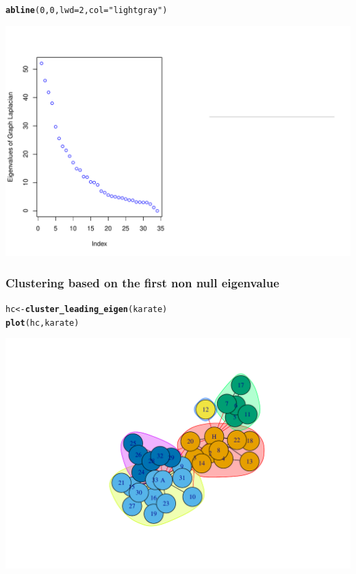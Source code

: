 \documentclass{beamer}\usepackage[]{graphicx}\usepackage[]{color}
\makeatletter
\newcommand{\hlnum}[1]{\textcolor[rgb]{0.686,0.059,0.569}{#1}}%
\newcommand{\hlstr}[1]{\textcolor[rgb]{0.192,0.494,0.8}{#1}}%
\newcommand{\hlstd}[1]{\textcolor[rgb]{0.345,0.345,0.345}{#1}}%
\newcommand{\hlkwb}[1]{\textcolor[rgb]{0.69,0.353,0.396}{#1}}%
\newcommand{\hlkwc}[1]{\textcolor[rgb]{0.333,0.667,0.333}{#1}}%
\newcommand{\hlkwd}[1]{\textcolor[rgb]{0.737,0.353,0.396}{\textbf{#1}}}%
\newenvironment{kframe}{%
 \def\at@end@of@kframe{}%
 \ifinner\ifhmode%
  \def\at@end@of@kframe{\end{minipage}}%
  \begin{minipage}{\columnwidth}%
 \fi\fi%
 \def\FrameCommand##1{\hskip\@totalleftmargin \hskip-\fboxsep
 \colorbox{shadecolor}{##1}\hskip-\fboxsep
     \hskip-\linewidth \hskip-\@totalleftmargin \hskip\columnwidth}%
 \MakeFramed {\advance\hsize-\width
   \@totalleftmargin\z@ \linewidth\hsize
   \@setminipage}}%
 {\par\unskip\endMakeFramed%
 \at@end@of@kframe}
\newenvironment{knitrout}{}{} %
\makeatother
\begin{document}
\begin{frame}
\begin{knitrout}
\begin{kframe}
{\ttfamily\noindent\bfseries\color{errorcolor}{\#\# Error in plot.xy(xy, type, ...): object 'f.colors' not found}}\begin{alltt}
\hlkwd{abline}\hlstd{(}\hlnum{0}\hlstd{,} \hlnum{0}\hlstd{,} \hlkwc{lwd}\hlstd{=}\hlnum{2}\hlstd{,} \hlkwc{col}\hlstd{=}\hlstr{"lightgray"}\hlstd{)}
\end{alltt}
\end{kframe}
\includegraphics[width=.8\textwidth]{figures/unnamed-chunk-5-1} 

\end{knitrout}

\end{frame}

\begin{frame}[fragile]
  \frametitle{Clustering based on the first non null eigenvalue}
  
\begin{knitrout}\scriptsize
{}\color{fgcolor}\begin{kframe}
\begin{alltt}
\hlstd{hc} \hlkwb{<-} \hlkwd{cluster_leading_eigen}\hlstd{(karate)}
\hlkwd{plot}\hlstd{(hc,karate)}
\end{alltt}
\end{kframe}
\includegraphics[width=.8\textwidth]{figures/unnamed-chunk-6-1} 

\end{knitrout}

\end{frame}
\end{document}
